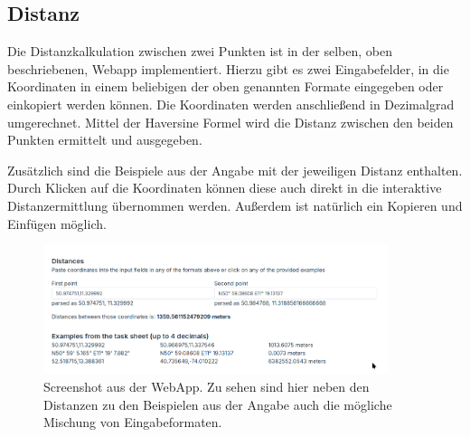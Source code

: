 \subsection{Distanz}

Die Distanzkalkulation zwischen zwei Punkten ist in der selben, oben beschriebenen, Webapp implementiert. Hierzu gibt es zwei Eingabefelder, in die Koordinaten in einem beliebigen der oben genannten Formate eingegeben oder einkopiert werden können. Die Koordinaten werden anschließend in Dezimalgrad umgerechnet. Mittel der Haversine Formel wird die Distanz zwischen den beiden Punkten ermittelt und ausgegeben.

Zusätzlich sind die Beispiele aus der Angabe mit der jeweiligen Distanz enthalten. Durch Klicken auf die Koordinaten können diese auch direkt in die interaktive Distanzermittlung übernommen werden. Außerdem ist natürlich ein Kopieren und Einfügen möglich.

\begin{figure}[h]
    \centering
    \includegraphics[width=0.9\textwidth]{figures/distanzkalkulation.png}
    \caption{Screenshot aus der WebApp. Zu sehen sind hier neben den Distanzen zu den Beispielen aus der Angabe auch die mögliche Mischung von Eingabeformaten.}
    \label{distanzkalkulation}
\end{figure}
